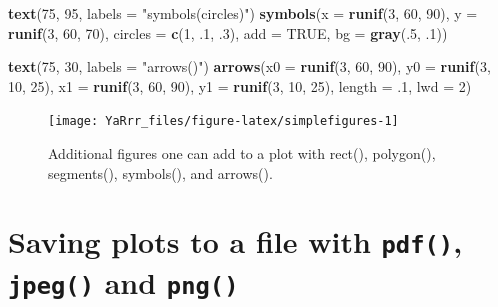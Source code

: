\documentclass[]{book}
\newenvironment{Shaded}{\begin{snugshade}}{\end{snugshade}}
\newcommand{\KeywordTok}[1]{\textcolor[rgb]{0.13,0.29,0.53}{\textbf{{#1}}}}
\newcommand{\DataTypeTok}[1]{\textcolor[rgb]{0.13,0.29,0.53}{{#1}}}
\newcommand{\DecValTok}[1]{\textcolor[rgb]{0.00,0.00,0.81}{{#1}}}
\newcommand{\StringTok}[1]{\textcolor[rgb]{0.31,0.60,0.02}{{#1}}}
\newcommand{\OtherTok}[1]{\textcolor[rgb]{0.56,0.35,0.01}{{#1}}}
\newcommand{\NormalTok}[1]{{#1}}
\theoremstyle{definition}
\theoremstyle{definition}
\theoremstyle{remark}
\begin{document}
\begin{Shaded}
\begin{Highlighting}[]
\KeywordTok{text}\NormalTok{(}\DecValTok{75}\NormalTok{, }\DecValTok{95}\NormalTok{, }\DataTypeTok{labels =} \StringTok{"symbols(circles)"}\NormalTok{)}
\KeywordTok{symbols}\NormalTok{(}\DataTypeTok{x =} \KeywordTok{runif}\NormalTok{(}\DecValTok{3}\NormalTok{, }\DecValTok{60}\NormalTok{, }\DecValTok{90}\NormalTok{),}
        \DataTypeTok{y =} \KeywordTok{runif}\NormalTok{(}\DecValTok{3}\NormalTok{, }\DecValTok{60}\NormalTok{, }\DecValTok{70}\NormalTok{),}
        \DataTypeTok{circles =} \KeywordTok{c}\NormalTok{(}\DecValTok{1}\NormalTok{, .}\DecValTok{1}\NormalTok{, .}\DecValTok{3}\NormalTok{),}
        \DataTypeTok{add =} \OtherTok{TRUE}\NormalTok{, }\DataTypeTok{bg =} \KeywordTok{gray}\NormalTok{(.}\DecValTok{5}\NormalTok{, .}\DecValTok{1}\NormalTok{))}

\KeywordTok{text}\NormalTok{(}\DecValTok{75}\NormalTok{, }\DecValTok{30}\NormalTok{, }\DataTypeTok{labels =} \StringTok{"arrows()"}\NormalTok{)}
\KeywordTok{arrows}\NormalTok{(}\DataTypeTok{x0 =} \KeywordTok{runif}\NormalTok{(}\DecValTok{3}\NormalTok{, }\DecValTok{60}\NormalTok{, }\DecValTok{90}\NormalTok{),}
       \DataTypeTok{y0 =} \KeywordTok{runif}\NormalTok{(}\DecValTok{3}\NormalTok{, }\DecValTok{10}\NormalTok{, }\DecValTok{25}\NormalTok{),}
       \DataTypeTok{x1 =} \KeywordTok{runif}\NormalTok{(}\DecValTok{3}\NormalTok{, }\DecValTok{60}\NormalTok{, }\DecValTok{90}\NormalTok{),}
       \DataTypeTok{y1 =} \KeywordTok{runif}\NormalTok{(}\DecValTok{3}\NormalTok{, }\DecValTok{10}\NormalTok{, }\DecValTok{25}\NormalTok{),}
       \DataTypeTok{length =} \NormalTok{.}\DecValTok{1}\NormalTok{, }\DataTypeTok{lwd =} \DecValTok{2}\NormalTok{)}
\end{Highlighting}
\end{Shaded}

\begin{figure}

{\centering \texttt{[image: YaRrr\_files/figure-latex/simplefigures-1]} 

}

\caption{Additional figures one can add to a plot with rect(), polygon(), segments(), symbols(), and arrows().}\label{fig:simplefigures}
\end{figure}

\section{\texorpdfstring{Saving plots to a file with \texttt{pdf()},
\texttt{jpeg()} and
\texttt{png()}}{Saving plots to a file with pdf(), jpeg() and png()}}\label{saving-plots-to-a-file-with-pdf-jpeg-and-png}
\end{document}
